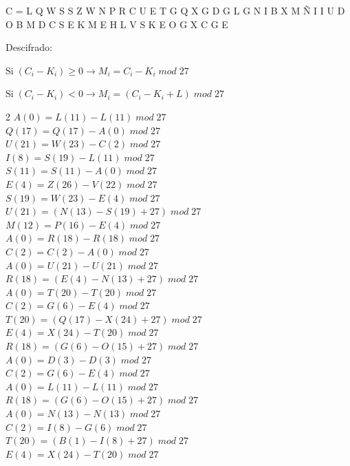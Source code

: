 \documentclass{article}
\begin{document}
\begin{enumerate}
C = L Q W S S Z W N P R C U E T G Q X G D G L G N I B X M Ñ I I U D O B M D C S E K M E H L V S K E O G X C G E


Descifrado:

$ \text{Si} \; (C_{i}- K_{i}) \ge 0 \rightarrow  M_{i} = C_{i} - K_{i} \;  mod \; 27$

$ \text{Si} \; (C_{i}- K_{i}) < 0 \rightarrow  M_{i} = (C_{i} - K_{i} + L ) \;  mod \; 27$ 


\begin{multicols}{2}
$A (0) = L (11) - L (11)\;  mod \; 27$\\
$Q (17) = Q (17) - A (0)\;  mod \; 27$\\
$U (21) = W (23) - C (2)\;  mod \; 27$\\
$I (8) = S (19) - L (11)\;  mod \; 27$\\
$S (11) = S (11) - A (0)\;  mod \; 27$\\
$E (4) = Z (26) - V (22)\;  mod \; 27$\\
$S (19) = W (23) - E (4)\;  mod \; 27$\\
$U (21) = (N (13) - S (19) + 27)\;  mod \; 27$\\
$M (12) = P (16) - E (4)\;  mod \; 27$\\
$A (0) = R (18) - R (18)\;  mod \; 27$\\
$C (2) = C (2) - A (0)\;  mod \; 27$\\
$A (0) = U (21) - U (21)\;  mod \; 27$\\
$R (18) = (E (4) - N (13) + 27)\;  mod \; 27$\\
$A (0) = T (20) - T (20)\;  mod \; 27$\\
$C (2) = G (6) - E (4)\;  mod \; 27$\\
$T (20) = (Q (17) - X (24) + 27)\;  mod \; 27$\\
$E (4) = X (24) - T (20)\;  mod \; 27$\\
$R (18) = (G (6) - O (15) + 27)\;  mod \; 27$\\
$A (0) = D (3) - D (3)\;  mod \; 27$\\
$C (2) = G(6) - E (4)\;  mod \; 27$\\
$A (0) = L (11) - L (11)\;  mod \; 27$\\
$R (18) = (G (6) - O (15) + 27)\;  mod \; 27$\\
$A (0) = N (13) - N (13)\;  mod \; 27$\\
$C (2) = I (8) - G (6)\;  mod \; 27$\\
$T (20) = (B (1) - I (8) + 27)\;  mod \; 27$\\
$E (4) = X (24) - T (20)\;  mod \; 27$\\

\end{multicols}
\end{enumerate}
\end{document}
